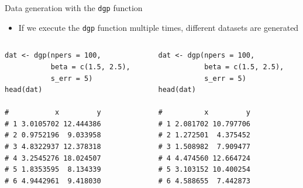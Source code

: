 \documentclass[aspectratio=169]{beamer}
\begin{document}
% 
\begin{frame}[fragile]{Data generation with the \textup{\texttt{dgp}} function}
  \begin{itemize}
    \item If we execute the \texttt{dgp} function multiple times, different
      datasets are generated
  \end{itemize}
\begin{columns}[T]
\begin{column}{0.5\textwidth}
\centering
\begin{lstlisting}
dat <- dgp(npers = 100, 
           beta = c(1.5, 2.5),
           s_err = 5)
head(dat)

#           x         y
# 1 3.0105702 12.444386
# 2 0.9752196  9.033958
# 3 4.8322937 12.378318
# 4 3.2545276 18.024507
# 5 1.8353595  8.134339
# 6 4.9442961  9.418030
\end{lstlisting}
\end{column}

\begin{column}{0.5\textwidth}
\centering
\begin{lstlisting}
dat <- dgp(npers = 100, 
           beta = c(1.5, 2.5),
           s_err = 5)
head(dat)

#          x         y
# 1 2.081702 10.797706
# 2 1.272501  4.375452
# 3 1.508982  7.909477
# 4 4.474560 12.664724
# 5 3.103152 10.400254
# 6 4.588655  7.442873
\end{lstlisting}
\end{column}
\end{columns}
\end{frame}
\end{document}

